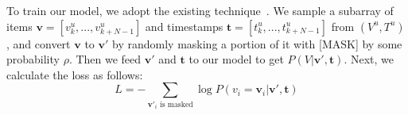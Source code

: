 To train our model, we adopt the existing technique~\cite{BERT4Rec}. 
We sample a subarray of items $\mathbf{v} = [v^u_k, ..., v^u_{k+N-1}]$ and timestamps $\mathbf{t} = [t^u_k, ..., t^u_{k+N-1}]$ from $(V^u, T^u)$, and convert $\mathbf{v}$ to $\mathbf{v'}$ by randomly masking a portion of it with [MASK] by some probability $\rho$. Then we feed $\mathbf{v'}$ and $\mathbf{t}$ to our model to get
$P(V | \mathbf{v'}, \mathbf{t})$. Next, we calculate the loss as follows:
\begin{equation}
    L = -\sum_{\mathbf{v'}_i \text{ is masked}}{\log{P(v_i = \mathbf{v}_i | \mathbf{v'}, \mathbf{t})}}
\end{equation}